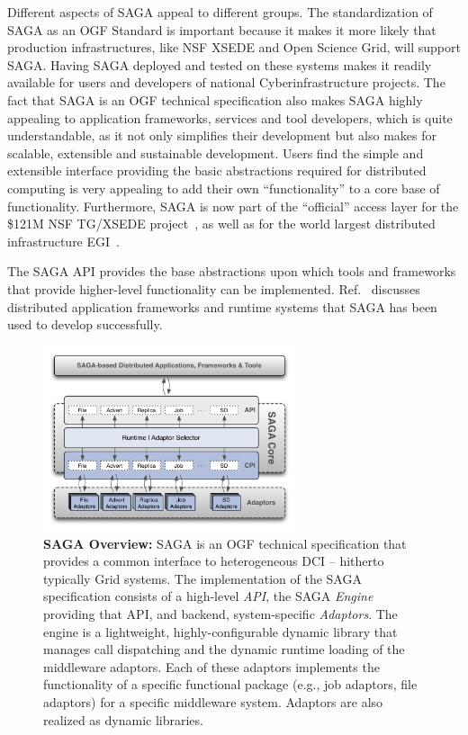 \documentclass[]{svjour3}
\begin{document}
Different aspects of SAGA appeal to different groups. The
standardization of SAGA as an OGF Standard is important because it
makes it more likely that production infrastructures, like NSF XSEDE
and Open Science Grid, will support SAGA. Having SAGA deployed and
tested on these systems makes it readily available for users and
developers of national Cyberinfrastructure projects. The fact that
SAGA is an OGF technical specification also makes SAGA highly
appealing to application frameworks, services and tool developers,
which is quite understandable, as it not only simplifies their
development but also makes for scalable, extensible and sustainable
development. Users find the simple and extensible interface providing
the basic abstractions required for distributed computing is very
appealing to add their own “functionality” to a core base of
functionality. Furthermore, SAGA is now part of the “official” access
layer for the \$121M NSF TG/XSEDE project~\cite{XSEDE}, as well as for
the world largest distributed infrastructure EGI~\cite{EGI}.

The SAGA API provides the base abstractions upon which tools and
frameworks that provide higher-level functionality can be
implemented. Ref.~\cite{saga_url} discusses distributed application
frameworks and runtime systems that SAGA has been used to develop
successfully. 


\begin{figure}[t]
\centering \includegraphics[width=0.66\textwidth]{figures/saga-architecture-1.png}
\caption{\textbf{SAGA Overview: } SAGA is an OGF technical
 specification that provides a common interface to heterogeneous DCI
 -- hitherto typically Grid systems. The implementation of the
 SAGA\cite{saga_url} specification consists of a high-level {\it
  API}, the SAGA {\it Engine} providing that API, and backend,
 system-specific {\it Adaptors}. The engine is a lightweight,
 highly-configurable dynamic library that manages call dispatching
 and the dynamic runtime loading of the middleware adaptors. Each of
 these adaptors implements the functionality of a specific functional
 package (e.g., job adaptors, file adaptors) for a specific
 middleware system. Adaptors are also realized as dynamic libraries.}
 \label{fig:saga-overview}
\end{figure}
\end{document}
